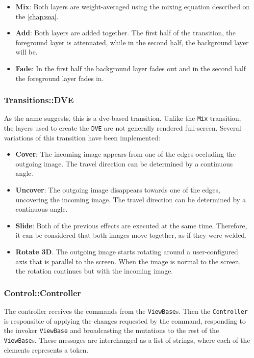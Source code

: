 \documentclass[../main.tex]{subfiles}
\begin{document}
\begin{itemize}
    \item \textbf{Mix}: Both layers are weight-averaged using the mixing equation described on the \autoref{chap:soa}.
    \item \textbf{Add}: Both layers are added together. The first half of the transition, the foreground layer is attenuated, while in the second half, the background layer will be.
    \item \textbf{Fade}: In the first half the background layer fades out and in the second half the foreground layer fades in.
\end{itemize}

\subsubsection{Transitions::DVE}
As the name suggests, this is a \gls{dve}-based transition. Unlike the \texttt{Mix} transition, the layers used to create the \texttt{DVE} are not generally rendered full-screen. Several variations of this transition have been implemented:

\begin{itemize}
    \item \textbf{Cover}: The incoming image appears from one of the edges occluding the outgoing image. The travel direction can be determined by a continuous angle.
    \item \textbf{Uncover}: The outgoing image disappears towards one of the edges, uncovering the incoming image. The travel direction can be determined by a continuous angle.
    \item \textbf{Slide}: Both of the previous effects are executed at the same time. Therefore, it can be considered that both images move together, as if they were welded.
    \item \textbf{Rotate 3D}. The outgoing image starts rotating around a user-configured axis that is parallel to the screen. When the image is normal to the screen, the rotation continues but with the incoming image.
\end{itemize}


\subsubsection{Control::Controller}
The controller receives the commands from the \texttt{ViewBase}s. Then the \texttt{Controller} is responsible of applying the changes requested by the command, responding to the invoker \texttt{ViewBase} and broadcasting the mutations to the rest of the \texttt{ViewBase}s. These messages are interchanged as a list of strings, where each of the elements represents a token.
\end{document}
